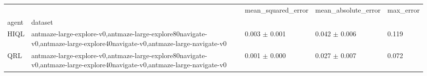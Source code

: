 \begin{tabular}{lllll}
\toprule
 &  & mean_squared_error & mean_absolute_error & max_error \\
agent & dataset &  &  &  \\
\midrule
HIQL & antmaze-large-explore-v0,antmaze-large-explore80navigate-v0,antmaze-large-explore40navigate-v0,antmaze-large-navigate-v0 & 0.003 $\pm$ 0.001 & 0.042 $\pm$ 0.006 & 0.119 \\
\cline{1-5}
QRL & antmaze-large-explore-v0,antmaze-large-explore80navigate-v0,antmaze-large-explore40navigate-v0,antmaze-large-navigate-v0 & 0.001 $\pm$ 0.000 & 0.027 $\pm$ 0.007 & 0.072 \\
\cline{1-5}
\bottomrule
\end{tabular}
